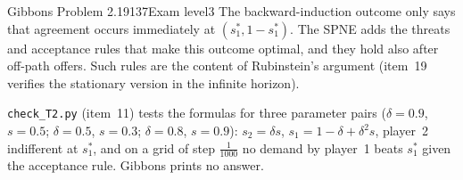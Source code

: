 \begin{exsol}{Gibbons Problem 2.19}{137}{Exam level}{3}
\interp The backward-induction outcome only says that agreement occurs immediately at $(s_1^*, 1 - s_1^*)$.
The SPNE adds the threats and acceptance rules that make this outcome optimal, and they hold also after
off-path offers. Such rules are the content of Rubinstein's argument (item~19 verifies the stationary
version in the infinite horizon).

\verify \texttt{check\_T2.py} (item~11) tests the formulas for three parameter pairs ($\delta = 0.9$, $s = 0.5$;
$\delta = 0.5$, $s = 0.3$; $\delta = 0.8$, $s = 0.9$): $s_2 = \delta s$, $s_1 = 1 - \delta + \delta^2 s$, player~2 indifferent at $s_1^*$, and on a grid
of step $\frac1{1000}$ no demand by player~1 beats $s_1^*$ given the acceptance rule. Gibbons prints no answer.

\end{exsol}
